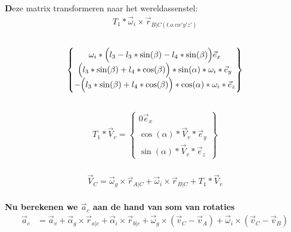 \documentclass[a4paper,10pt]{article}
\begin{document}
\textbf Deze matrix transformeren naar het wereldassenstel:\
\begin{equation}
	\begin{aligned}
		{T}_{1}* \vec{\omega}_i \times \vec{r}_{B|C(t.o.v x'y'z')}
	\end{aligned}
\end{equation}\\
\begin{equation}
	\begin{Bmatrix}
		{\omega_i*\Big(l_3 -l_3*\sin(\beta) - l_4 *\sin(\beta)\Big)\vec{e}_{x}}\\
		\Big(l_3 * \sin(\beta) + l_4 * \cos(\beta)\Big)*\sin(\alpha) *\omega_i *\vec{e}_{y}\\
		-\Big{(l_3 * \sin(\beta) + l_4 * \cos(\beta)\Big)*\cos(\alpha) *\omega_i*\vec{e}_{z}}
	\end{Bmatrix}
\end{equation}\\
\begin{equation}
	\begin{aligned}
		{T}_{1}* \vec{V}_v = \begin{Bmatrix}
			{0\vec{e}_{x}}\\
			\cos(\alpha)*\vec{V}_v*\vec{e}_{y}\\
			\sin(\alpha)*\vec{V}_v*\vec{e}_{z}
		\end{Bmatrix}
	\end{aligned}
\end{equation}\\
\begin{equation}
	\begin{aligned}
		\vec{V}_{C}=  \vec{\omega}_g \times \vec{r}_{A|C} + \vec{\omega}_i \times \vec{r}_{B|C} +{T}_{1}* \vec{V}_v
	\end{aligned}
\end{equation}\\
\textbf{Nu berekenen we $\vec{a}_c$ aan de hand van som van rotaties} 
\begin{equation}
	\begin{aligned}
		\vec{a}_c &= \vec{a}_v + \vec{\alpha}_g  \times \vec{r}_{a|c} + \vec{\alpha}_i \times \vec{r}_{b|c} + \vec{\omega}_g \times ( \vec{v}_{C} - \vec{v}_{A}) + \vec{\omega}_i \times ( \vec{v}_{C} - \vec{v}_{B})\\
	\end{aligned}
\end{equation}
\end{document}
